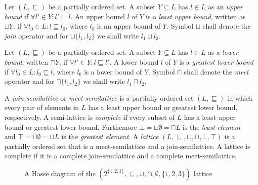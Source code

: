\begin{defn}
Let $(L, \sqsubseteq)$ be a partially ordered set. A subset $Y \subseteq L$ has $l \in L$ as an \emph{upper bound} if $\forall l' \in Y: l' \sqsubseteq l$. An upper bound $l$ of $Y$ is a \emph{least upper bound}, written as $\sqcup Y$, if $\forall l_0 \in L: l \sqsubseteq l_0$, where $l_0$ is an upper bound of $Y$. Symbol $\sqcup$ shall denote the \emph{join} operator and for $\sqcup\{l_1, l_2\}$ we shall write $l_1 \sqcup l_2$.
\end{defn}

\begin{defn}
Let $(L, \sqsubseteq)$ be a partially ordered set. A subset $Y \subseteq L$ has $l \in L$ as a \emph{lower bound}, written $\sqcap Y$, if $\forall l' \in Y: l \sqsubseteq l'$. A lower bound $l$ of $Y$ is a \emph{greatest lower bound} if $\forall l_0 \in L: l_0 \sqsubseteq l$, where $l_0$ is a lower bound of $Y$. Symbol $\sqcap$ shall denote the \emph{meet} operator and for $\sqcap\{l_1, l_2\}$ we shall write $l_1 \sqcap l_2$.
\end{defn}

\begin{defn}
A \emph{join-semilattice} or \emph{meet-semilattice} is a partially ordered set $(L, \sqsubseteq)$ in which every pair of elements in $L$ has a least upper bound or greatest lower bound, respectively. A semi-lattice is \emph{complete} if every subset of $L$ has a least upper bound or greatest lower bound. Furthemore $\bot = \sqcup \emptyset = \sqcap L$ is the \emph{least element} and $\top = \sqcap \emptyset = \sqcup L$ is the \emph{greatest element}. A \emph{lattice} $(L, \sqsubseteq, \sqcup, \sqcap, \bot, \top)$ is a partially ordered set that is a meet-semilattice and a join-semilattice. A lattice is complete if it is a complete join-semilattice and a complete meet-semilattice.
\end{defn}

\begin{figure}[H]
    \centering
    \caption{A Hasse diagram of the $(2^{\{1,2,3\}}, \subseteq, \cup, \cap, \emptyset, \{1,2,3\})$ lattice}
    \label{fig_hasse_diag}
\end{figure}


